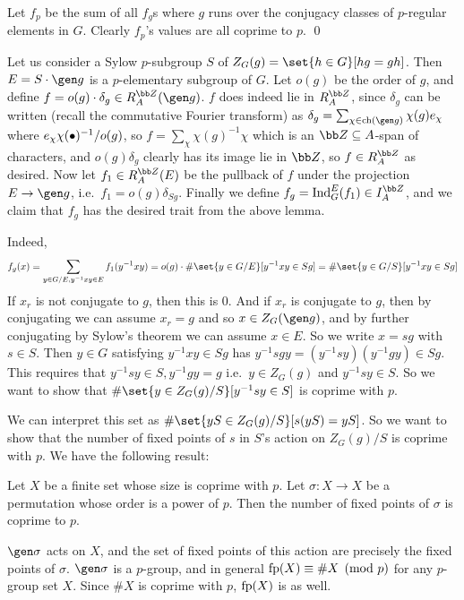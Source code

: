 \elemm

\bproof

    Let $f_p$ be the sum of all $f_g$s where $g$ runs over the conjugacy classes of $p$-regular elements in $G$.
    Clearly $f_p$'s values are all coprime to $p$.
    \qed

\eproof

Let us consider a Sylow $p$-subgroup $S$ of $Z_G(g)=\set{h\in G}[hg=gh]$.
Then $E=S\cdot\gen g$ is a $p$-elementary subgroup of $G$.
Let $o(g)$ be the order of $g$, and define $f=o(g)\cdot\delta_{g}\in R^\bZ_A(\gen g)$.
$f$ does indeed lie in $R^\bZ_A$, since $\delta_g$ can be written (recall the commutative Fourier transform) as $\delta_g=\sum_{\chi\in\ch(\gen g)}\chi(g)e_\chi$ where
$e_\chi\chi(\bullet)^{-1}/o(g)$, so $f=\sum_\chi\chi(g)^{-1}\chi$ which is an $\bZ\subseteq A$-span of characters, and $o(g)\delta_g$ clearly has its image lie in $\bZ$, so $f\in R^\bZ_A$ as desired.
Now let $f_1\in R^\bZ_A(E)$ be the pullback of $f$ under the projection $E\to\gen g$, i.e.\ $f_1=o(g)\delta_{Sg}$.
Finally we define $f_g=\Ind^E_G(f_1)\in I^\bZ_A$, and we claim that $f_g$ has the desired trait from the above lemma.

Indeed,
$$ f_g(x) = \sum_{y\in G/E,y^{-1}xy\in E}f_1(y^{-1}xy) = o(g)\cdot\#\set{y\in G/E}[y^{-1}xy\in Sg] = \#\set{y\in G/S}[y^{-1}xy\in Sg] $$
If $x_r$ is not conjugate to $g$, then this is $0$.
And if $x_r$ is conjugate to $g$, then by conjugating we can assume $x_r=g$ and so $x\in Z_G(\gen g)$, and by further conjugating by Sylow's theorem we can assume $x\in E$.
So we write $x=sg$ with $s\in S$.
Then $y\in G$ satisfying $y^{-1}xy\in Sg$ has $y^{-1}sgy=(y^{-1}sy)(y^{-1}gy)\in Sg$.
This requires that $y^{-1}sy\in S,y^{-1}gy=g$ i.e.\ $y\in Z_G(g)$ and $y^{-1}sy\in S$.
So we want to show that $\#\set{y\in Z_G(g)/S}[y^{-1}sy\in S]$ is coprime with $p$.

We can interpret this set as $\#\set{yS\in Z_G(g)/S}[s(yS)=yS]$.
So we want to show that the number of fixed points of $s$ in $S$'s action on $Z_G(g)/S$ is coprime with $p$.
We have the following result:

\blemm

    Let $X$ be a finite set whose size is coprime with $p$.
    Let $\sigma\colon X\to X$ be a permutation whose order is a power of $p$.
    Then the number of fixed points of $\sigma$ is coprime to $p$.

\elemm

\bproof

    $\gen\sigma$ acts on $X$, and the set of fixed points of this action are precisely the fixed points of $\sigma$.
    $\gen\sigma$ is a $p$-group, and in general ${\rm fp}(X)\equiv\#X\pmod p$ for any $p$-group set $X$.
    Since $\#X$ is coprime with $p$, ${\rm fp}(X)$ is as well.

